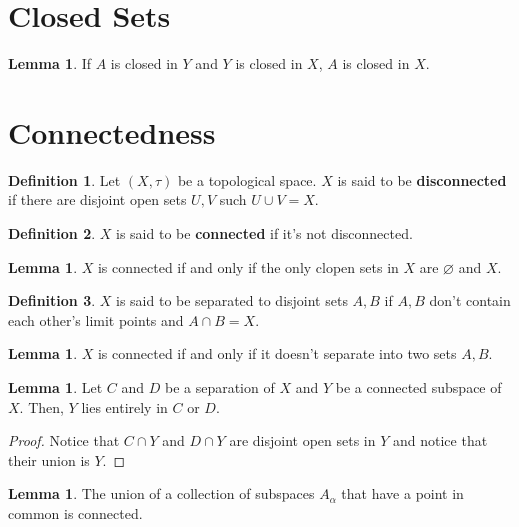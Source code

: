\documentclass{article}
\theoremstyle{definition}
\newtheorem{definition}{Definition}
\newtheorem{lemma}[theorem]{Lemma}
\begin{document}
\newpage

\section{Closed Sets}


\begin{lemma}
    If $A$ is closed in $Y$ and $Y$ is closed in $X$,
    $A$ is closed in $X$.
\end{lemma}


\newpage

\section{Connectedness}

\begin{definition}
    Let $(X,\tau)$ be a topological space. $X$ is said to be \textbf{disconnected}
    if there are disjoint open sets $U,V$ such $U \cup V = X$.
\end{definition}

\begin{definition}
    $X$ is said to be \textbf{connected} if it's not disconnected.
\end{definition}

\begin{lemma}
    $X$ is connected if and only if the only clopen sets in $X$ are $\varnothing$ and $X$.
\end{lemma}

\begin{definition}
    $X$ is said to be separated to disjoint sets $A,B$ if $A,B$ don't contain each other's limit points
    and $A \cap B = X$.
\end{definition}

\begin{lemma}
    $X$ is connected if and only if it doesn't separate into two sets $A,B$.
\end{lemma}

\begin{lemma}
    Let $C$ and $D$ be a separation of $X$ and $Y$ be a connected subspace of $X$.
    Then, $Y$ lies entirely in $C$ or $D$.
\end{lemma}
\begin{proof}
    Notice that $C \cap Y$ and $D \cap Y$ are disjoint open sets in $Y$ and notice
    that their union is $Y$.
\end{proof}

\begin{lemma}
    The union of a collection of subspaces $A_{\alpha}$ that have a point
    in common is connected.
\end{lemma}
\end{document}
